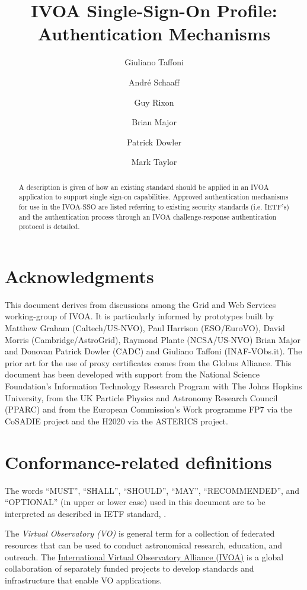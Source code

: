 \documentclass[11pt,a4paper]{ivoa}
\title{IVOA Single-Sign-On Profile: Authentication Mechanisms}
\author{Giuliano Taffoni}
\author{Andr\'e Schaaff}
\author{Guy Rixon}
\author{Brian Major}
\author{Patrick Dowler}
\author{Mark Taylor}
\begin{document}
\begin{abstract}

A description is given of how an existing standard should be applied 
in an IVOA application to support single sign-on capabilities.
Approved authentication mechanisms for use in the IVOA-SSO are listed
referring to existing security standards (i.e. IETF's) and the
authentication process through an IVOA challenge-response 
authentication protocol is detailed.
\end{abstract}

\section*{Acknowledgments}

This document derives from discussions among the Grid and Web Services
working-group of IVOA. It is particularly informed by prototypes built
by Matthew Graham (Caltech/US-NVO), Paul Harrison (ESO/EuroVO), David
Morris (Cambridge/AstroGrid), Raymond Plante (NCSA/US-NVO) Brian Major
and  Donovan Patrick Dowler (CADC) and Giuliano Taffoni (INAF-VObs.it).
The prior art for the use of proxy certificates comes from the Globus
Alliance.
This document has been developed with support from the National Science
Foundation's Information Technology Research Program  with The Johns
Hopkins University, from the UK Particle Physics and Astronomy Research
Council (PPARC) and from the European Commission's Work programme FP7
via the  CoSADIE project and the H2020 via the ASTERICS project.


\section*{Conformance-related definitions}
The words ``MUST'', ``SHALL'', ``SHOULD'', ``MAY'', ``RECOMMENDED'', and
``OPTIONAL'' (in upper or lower case) used in this document are to be
interpreted as described in IETF standard, \citet{std:RFC2119}.

The \emph{Virtual Observatory (VO)} is
general term for a collection of federated resources that can be used
to conduct astronomical research, education, and outreach.
The \href{http://www.ivoa.net}{International
Virtual Observatory Alliance (IVOA)} is a global
collaboration of separately funded projects to develop standards and
infrastructure that enable VO applications.
\end{document}
